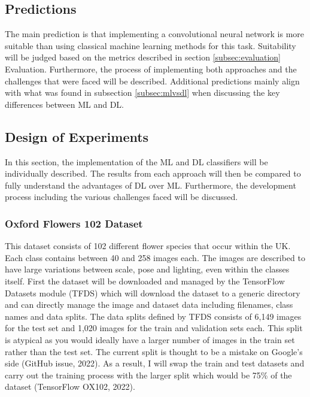 \documentclass{article}
\begin{document}
\subsection{Predictions}

The main prediction is that implementing a convolutional neural network is more suitable than using classical machine 
learning methods for this task. Suitability will be judged based on the metrics described in section
\ref{subsec:evaluation} Evaluation. Furthermore, the process of implementing 
both approaches and the challenges that were faced will be described. Additional predictions mainly align with what was 
found in subsection \ref{subsec:mlvsdl} when discussing the key differences between ML and DL.

\subsection{Design of Experiments}

In this section, the implementation of the ML and DL classifiers will be individually described. The results from each
approach will then be compared to fully understand the advantages of DL over ML. Furthermore, the development process
including the various challenges faced will be discussed.

\subsubsection{Oxford Flowers 102 Dataset}

This dataset consists of 102 different flower species that occur within the UK. Each class contains between 40 and 258 
images each. The images are described to have large variations between scale, pose and lighting, even within the classes
itself. First the dataset will be downloaded and managed by the TensorFlow Datasets module (TFDS) which will download 
the dataset to a generic directory and can directly manage the image and dataset data including filenames, class names 
and data splits. The data splits defined by TFDS consists of 6,149 images for the test set and 1,020 images for the 
train and validation sets each. This split is atypical as you would ideally have a larger number of images in the train 
set rather than the test set. The current split is thought to be a mistake on Google’s side (GitHub issue, 2022). As a 
result, I will swap the train and test datasets and carry out the training process with the larger split which would be 
75\% of the dataset (TensorFlow OX102, 2022).  

\clearpage
\printbibliography
\end{document}
